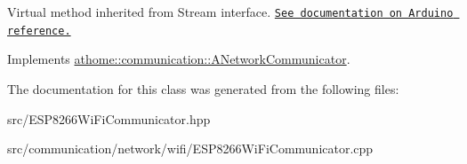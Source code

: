 Virtual method inherited from Stream interface. \href{https://www.arduino.cc/en/Serial/Write}{\tt See documentation on Arduino reference.} 

Implements \mbox{\hyperlink{classathome_1_1communication_1_1_a_network_communicator_a87adf68359a4ec5b0a38bea529ebf732}{athome\+::communication\+::\+A\+Network\+Communicator}}.



The documentation for this class was generated from the following files\+:\begin{DoxyCompactItemize}
\item 
src/E\+S\+P8266\+Wi\+Fi\+Communicator.\+hpp\item 
src/communication/network/wifi/E\+S\+P8266\+Wi\+Fi\+Communicator.\+cpp\end{DoxyCompactItemize}
